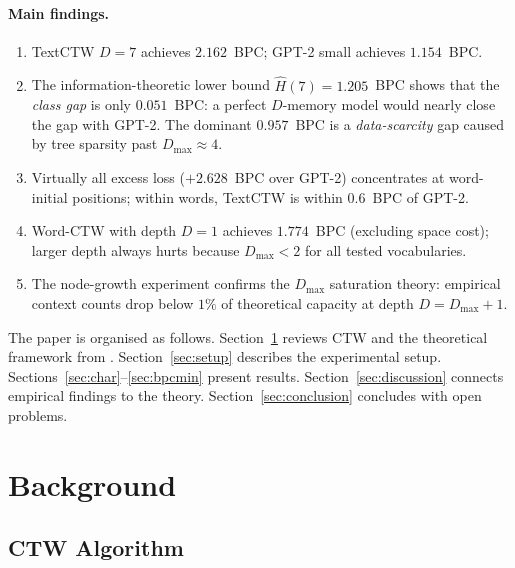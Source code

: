 \documentclass[11pt,a4paper]{article}
\newcommand{\bpcmin}{\widehat{H}}
\newcommand{\dmax}{D_{\max}}
\begin{document}
\paragraph{Main findings.}
\begin{enumerate}[leftmargin=1.5em]
  \item TextCTW $D=7$ achieves $2.162$~BPC; GPT-2 small achieves $1.154$~BPC.
  \item The information-theoretic lower bound $\bpcmin(7) = 1.205$~BPC
        shows that the \emph{class gap} is only $0.051$~BPC:
        a perfect $D$-memory model would nearly close the gap with GPT-2.
        The dominant $0.957$~BPC is a \emph{data-scarcity} gap
        caused by tree sparsity past $\dmax \approx 4$.
  \item Virtually all excess loss ($+2.628$~BPC over GPT-2) concentrates
        at word-initial positions; within words, TextCTW is within $0.6$~BPC
        of GPT-2.
  \item Word-CTW with depth $D=1$ achieves $1.774$~BPC (excluding space cost);
        larger depth always hurts because $\dmax < 2$ for all tested vocabularies.
  \item The node-growth experiment confirms the $\dmax$ saturation theory:
        empirical context counts drop below $1\%$ of theoretical capacity
        at depth $D = \dmax + 1$.
\end{enumerate}

The paper is organised as follows.
Section~\ref{sec:background} reviews CTW and the theoretical framework from
\citet{Willems2026}.
Section~\ref{sec:setup} describes the experimental setup.
Sections~\ref{sec:char}--\ref{sec:bpcmin} present results.
Section~\ref{sec:discussion} connects empirical findings to the theory.
Section~\ref{sec:conclusion} concludes with open problems.

\section{Background}
\label{sec:background}

\subsection{CTW Algorithm}
\label{ssec:ctw}
\end{document}
